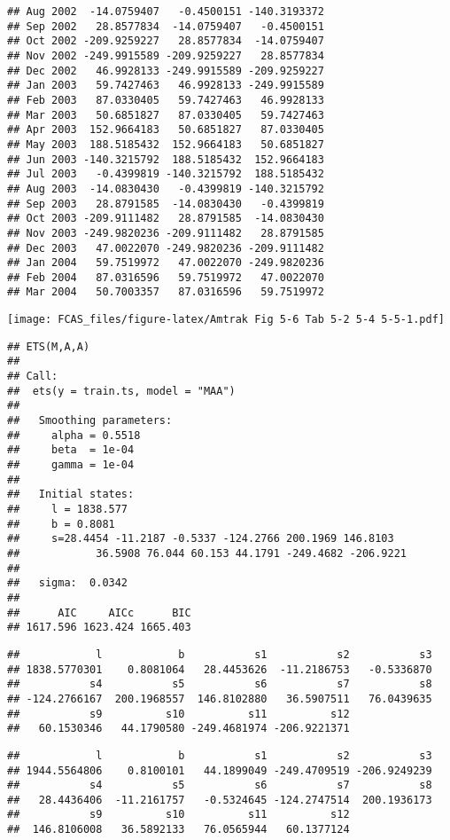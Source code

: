 \documentclass[]{article}
\begin{document}
\begin{verbatim}
## Aug 2002  -14.0759407   -0.4500151 -140.3193372
## Sep 2002   28.8577834  -14.0759407   -0.4500151
## Oct 2002 -209.9259227   28.8577834  -14.0759407
## Nov 2002 -249.9915589 -209.9259227   28.8577834
## Dec 2002   46.9928133 -249.9915589 -209.9259227
## Jan 2003   59.7427463   46.9928133 -249.9915589
## Feb 2003   87.0330405   59.7427463   46.9928133
## Mar 2003   50.6851827   87.0330405   59.7427463
## Apr 2003  152.9664183   50.6851827   87.0330405
## May 2003  188.5185432  152.9664183   50.6851827
## Jun 2003 -140.3215792  188.5185432  152.9664183
## Jul 2003   -0.4399819 -140.3215792  188.5185432
## Aug 2003  -14.0830430   -0.4399819 -140.3215792
## Sep 2003   28.8791585  -14.0830430   -0.4399819
## Oct 2003 -209.9111482   28.8791585  -14.0830430
## Nov 2003 -249.9820236 -209.9111482   28.8791585
## Dec 2003   47.0022070 -249.9820236 -209.9111482
## Jan 2004   59.7519972   47.0022070 -249.9820236
## Feb 2004   87.0316596   59.7519972   47.0022070
## Mar 2004   50.7003357   87.0316596   59.7519972
\end{verbatim}

\texttt{[image: FCAS\_files/figure-latex/Amtrak Fig 5-6 Tab 5-2 5-4 5-5-1.pdf]}

\begin{verbatim}
## ETS(M,A,A) 
## 
## Call:
##  ets(y = train.ts, model = "MAA") 
## 
##   Smoothing parameters:
##     alpha = 0.5518 
##     beta  = 1e-04 
##     gamma = 1e-04 
## 
##   Initial states:
##     l = 1838.577 
##     b = 0.8081 
##     s=28.4454 -11.2187 -0.5337 -124.2766 200.1969 146.8103
##            36.5908 76.044 60.153 44.1791 -249.4682 -206.9221
## 
##   sigma:  0.0342
## 
##      AIC     AICc      BIC 
## 1617.596 1623.424 1665.403
\end{verbatim}

\begin{verbatim}
##            l            b           s1           s2           s3 
## 1838.5770301    0.8081064   28.4453626  -11.2186753   -0.5336870 
##           s4           s5           s6           s7           s8 
## -124.2766167  200.1968557  146.8102880   36.5907511   76.0439635 
##           s9          s10          s11          s12 
##   60.1530346   44.1790580 -249.4681974 -206.9221371
\end{verbatim}

\begin{verbatim}
##            l            b           s1           s2           s3 
## 1944.5564806    0.8100101   44.1899049 -249.4709519 -206.9249239 
##           s4           s5           s6           s7           s8 
##   28.4436406  -11.2161757   -0.5324645 -124.2747514  200.1936173 
##           s9          s10          s11          s12 
##  146.8106008   36.5892133   76.0565944   60.1377124
\end{verbatim}
\end{document}
